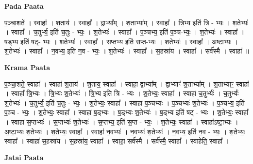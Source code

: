 \documentclass[17pt]{extarticle}
\begin{document}
\textbf{Pada Paata} \newline

प॒ञ्चा॒शते᳚ । स्वाहा᳚ । श॒ताय॑ । स्वाहा᳚ । द्वाभ्या᳚म् । श॒ताभ्या᳚म् । स्वाहा᳚ । त्रि॒भ्य इति॑ त्रि - भ्यः । श॒तेभ्यः॑ । स्वाहा᳚ । च॒तुर्भ्य॒ इति॑ च॒तुः - भ्यः॒ । श॒तेभ्यः॑ । स्वाहा᳚ । प॒ञ्चभ्य॒ इति॑ प॒ञ्च-भ्यः॒ । श॒तेभ्यः॑ । स्वाहा᳚ । ष॒ड्भ्य इति॑ षट्- भ्यः । श॒तेभ्यः॑ । स्वाहा᳚ । स॒प्तभ्य॒ इति॑ स॒प्त-भ्यः॒ । श॒तेभ्यः॑ । स्वाहा᳚ । अ॒ष्टा॒भ्यः । श॒तेभ्यः॑ । स्वाहा᳚ । न॒वभ्य॒ इति॑ न॒व - भ्यः॒ । श॒तेभ्यः॑ । स्वाहा᳚ । स॒हस्रा॑य । स्वाहा᳚ । सर्व॑स्मै । स्वाहा᳚ ॥  \newline


\textbf{Krama Paata} \newline

प॒ञ्चा॒शते॒ स्वाहा᳚ । स्वाहा॑ श॒ताय॑ । श॒ताय॒ स्वाहा᳚ । स्वाहा॒ द्वाभ्या᳚म् । द्वाभ्याꣳ॑ श॒ताभ्या᳚म् । श॒ताभ्याꣳ॒॒ स्वाहा᳚ । स्वाहा᳚ त्रि॒भ्यः । त्रि॒भ्यः श॒तेभ्यः॑ । त्रि॒भ्य इति॑ त्रि - भ्यः । श॒तेभ्यः॒ स्वाहा᳚ । स्वाहा॑ च॒तुर्भ्यः॑ । च॒तुर्भ्यः॑ श॒तेभ्यः॑ । च॒तुर्भ्य॒ इति॑ च॒तुः - भ्यः॒ । श॒तेभ्यः॒ स्वाहा᳚ । स्वाहा॑ प॒ञ्चभ्यः॑ । प॒ञ्चभ्यः॑ श॒तेभ्यः॑ । प॒ञ्चभ्य॒ इति॑ प॒ञ्च - भ्यः॒ । श॒तेभ्यः॒ स्वाहा᳚ । स्वाहा॑ ष॒ड्भ्यः । ष॒ड्भ्यः श॒तेभ्यः॑ । ष॒ड्भ्य इति॑ षट् - भ्यः । श॒तेभ्यः॒ स्वाहा᳚ । स्वाहा॑ स॒प्तभ्यः॑ । स॒प्तभ्यः॑ श॒तेभ्यः॑ । स॒प्तभ्य॒ इति॑ स॒प्त - भ्यः॒ । श॒तेभ्यः॒ स्वाहा᳚ । स्वाहा᳚ऽष्टा॒भ्यः । अ॒ष्टा॒भ्यः श॒तेभ्यः॑ । श॒तेभ्यः॒ स्वाहा᳚ । स्वाहा॑ न॒वभ्यः॑ । न॒वभ्यः॑ श॒तेभ्यः॑ । न॒वभ्य॒ इति॑ न॒व - भ्यः॒ । श॒तेभ्यः॒ स्वाहा᳚ । स्वाहा॑ स॒हस्रा॑य । स॒हस्रा॑य॒ स्वाहा᳚ । स्वाहा॒ सर्व॑स्मै । सर्व॑स्मै॒ स्वाहा᳚ । स्वाहेति॒ स्वाहा᳚ । \newline

\textbf{Jatai Paata} \newline
\end{document}
